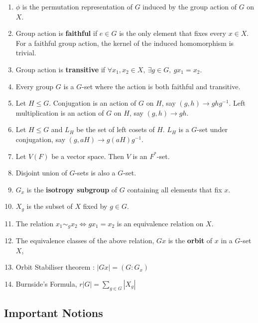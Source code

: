 \begin{enumerate}
	\item $\phi$ is the permutation representation of $G$ induced by the group action of $G$ on $X$.
	\item Group action is \textbf{faithful} if $e \in G$ is the only element that fixes every $x \in X$.
		\subitem For a faithful group action, the kernel of the induced homomorphism is trivial.
	\item Group action is \textbf{transitive} if $\forall x_1,x_2 \in X,\ \exists g \in G,\ gx_1 = x_2$.
	\item Every group $G$ is a $G$-set where the action is both faithful and transitive. 
	\item Let $H \le G$. 
		\subitem Conjugation is an action of $G$ on $H$, say $(g,h) \to ghg^{-1}$. 
		\subitem Left multiplication is an action of $G$ on $H$, say $(g,h) \to gh$. 
	\item Let $H \le G$ and $L_H$ be the set of left cosets of $H$. 
		\subitem $L_H$ is a $G$-set under conjugation, say $(g,aH) \to g(aH)g^{-1}$.
	\item Let $V(F)$ be a vector space. Then $V$ is an $F^\ast$-set.
	\item Disjoint union of $G$-sets is also a $G$-set.
	\item $G_x$ is the \textbf{isotropy subgroup} of $G$ containing all elements that fix $x$.
	\item $X_g$ is the subset of $X$ fixed by $g \in G$.
	\item The relation $x_1 \sim_g x_2 \iff gx_1=x_2$ is an equivalence relation on $X$.
	\item The equivalence classes of the above relation, $Gx$ is the \textbf{orbit} of $x$ in a $G$-set $X$, 
	\item Orbit Stabiliser theorem : $|Gx| = (G:G_x)$
	\item Burnside's Formula, $r |G| = \sum_{g \in G}|X_g|$
\end{enumerate}

\subsection*{Important Notions}
